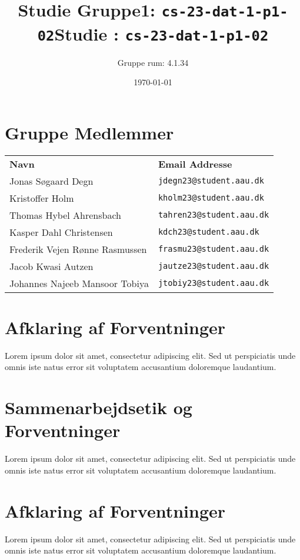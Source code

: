 \documentclass{article}
\begin{document}
\title{Studie Gruppe1: \texttt{cs-23-dat-1-p1-02}}
\title{Studie : \texttt{cs-23-dat-1-p1-02}}
\author{Gruppe rum: 4.1.34}
\date{\today}
\maketitle

\section*{Gruppe Medlemmer}
\begin{tabular}{ll}
\textbf{Navn} & \textbf{Email Addresse} \\
Jonas Søgaard Degn & \texttt{jdegn23@student.aau.dk} \\
Kristoffer Holm & \texttt{kholm23@student.aau.dk} \\
Thomas Hybel Ahrensbach & \texttt{tahren23@student.aau.dk} \\
Kasper Dahl Christensen & \texttt{kdch23@student.aau.dk} \\
Frederik Vejen Rønne Rasmussen & \texttt{frasmu23@student.aau.dk} \\
Jacob Kwasi Autzen & \texttt{jautze23@student.aau.dk} \\
Johannes Najeeb Mansoor Tobiya & \texttt{jtobiy23@student.aau.dk} \\
\end{tabular}



\section*{Afklaring af Forventninger}
Lorem ipsum dolor sit amet, consectetur adipiscing elit. Sed ut perspiciatis unde omnis iste natus error sit voluptatem accusantium doloremque laudantium.


\section*{Sammenarbejdsetik og Forventninger}
Lorem ipsum dolor sit amet, consectetur adipiscing elit. Sed ut perspiciatis unde omnis iste natus error sit voluptatem accusantium doloremque laudantium.


\section*{Afklaring af Forventninger}
Lorem ipsum dolor sit amet, consectetur adipiscing elit. Sed ut perspiciatis unde omnis iste natus error sit voluptatem accusantium doloremque laudantium.
\end{document}
